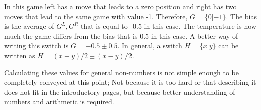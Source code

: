 \begin{figure} [!ht]
	\begin{center}
	\end{center}
	\caption{}
\end{figure}

In this game left has a move that leads to a zero position and right has two moves that lead to the same game with value -1. Therefore, $G = \{0 | -1\}$. The bias is the average of $G^L, G^R$ that is equal to -0.5 in this case. The temperature is how much the game differs from the bias that is 0.5 in this case. A better way of writing this switch is $G = -0.5 \pm 0.5$. In general, a switch $H = \{x| y\}$ can be written as $H = (x+y)/2 \pm (x-y)/2$.

Calculating these values for general non-numbers is not simple enough to be completely conveyed at this point; Not because it is too hard or that describing it does not fit in the introductory pages, but because better understanding of numbers and arithmetic is required.






